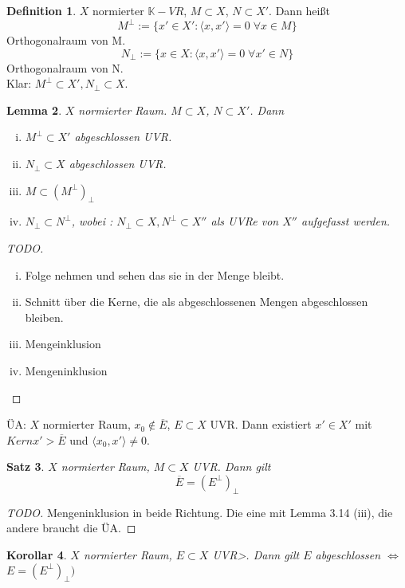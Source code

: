 \documentclass[ngerman]{report}
\theoremstyle{plain}%
\newtheorem{thm}{Satz}[chapter]
\newtheorem{lemma}[thm]{Lemma}
\newtheorem{cor}[thm]{Korollar}
\theoremstyle{definition}%
\newtheorem{definition}[thm]{Definition}
\theoremstyle{myStyle}
\newcommand{\K}{\mathbb{K}}
\newcommand{\aq}{\Leftrightarrow} %
\newcommand{\set}[1]{\{#1\}}
\newcommand{\fop}[1]{\langle #1 \rangle}
\begin{document}
	\begin{definition}
		$X$ normierter $\K-VR$, $M \subset X$, $N \subset X'$. Dann heißt 
			$$ M^\perp := \set{x' \in X' : \fop{x,x'} = 0 \; \forall x\in M}$$
			Orthogonalraum von M.
			$$ N_\perp := \set{ x\in X : \fop{x,x'} = 0 \; \forall x' \in N}$$
			Orthogonalraum von N. \\
			Klar: $M^\perp \subset X', N_\perp \subset X$.
	\end{definition}

	\begin{lemma}
		$X$ normierter Raum. $M\subset X$, $N \subset X'$. Dann
				\begin{enumerate}[(i)]
					\item $M^\perp \subset X'$ abgeschlossen UVR.
					\item $N_\perp \subset X$ abgeschlossen UVR.
					\item $M \subset (M^\perp)_\perp$
					\item $N_\perp \subset N^\perp$, wobei : $N_\perp \subset X, N^\perp \subset X''$ als UVRe von $X''$ aufgefasst werden.
				\end{enumerate}
	\end{lemma}

	\begin{proof}[TODO]
			\begin{enumerate}[(i)]
				\item Folge nehmen und sehen das sie in der Menge bleibt.
				\item Schnitt über die Kerne, die als abgeschlossenen Mengen abgeschlossen bleiben.
				\item Mengeinklusion
				\item Mengeninklusion
			\end{enumerate}
	\end{proof}

	ÜA: $X$ normierter Raum, $x_0 \not\in \overline{E}$, $E\subset X$ UVR. Dann existiert $x' \in X'$ mit  $Kern x' > \overline{E}$ und $\fop{x_0, x'} \neq 0.$

	\begin{thm} $X$ normierter Raum, $M \subset X$ UVR. Dann gilt 
		$$\overline{E} = (E^\perp)_\perp $$
	\end{thm}

	\begin{proof}[TODO]
		Mengeninklusion in beide Richtung. Die eine mit Lemma 3.14 (iii), die andere braucht die ÜA. 
	\end{proof}

	\begin{cor} 
		$X$ normierter Raum, $E\subset X$ UVR>. Dann gilt $E$ abgeschlossen $\aq$	$ E = (E^\perp)_\perp)$
	\end{cor}
\end{document}
